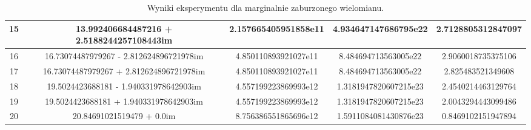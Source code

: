 \documentclass{article}
\begin{document}
\begin{table}[H]
\begin{adjustbox}{center}
\begin{tabular}{|c|c|c|c|c|}
    \hline
    15 & 13.992406684487216 + 2.5188244257108443im & 2.157665405951858e11 & 4.934647147686795e22 & 2.7128805312847097\\
    \hline
    16 & 16.73074487979267 - 2.812624896721978im & 4.850110893921027e11 & 8.484694713563005e22 & 2.9060018735375106\\
    \hline
    17 & 16.73074487979267 + 2.812624896721978im & 4.850110893921027e11 & 8.484694713563005e22 & 2.825483521349608\\
    \hline
    18 & 19.5024423688181 - 1.940331978642903im & 4.557199223869993e12 & 1.3181947820607215e23 & 2.4540214463129764\\
    \hline
    19 & 19.5024423688181 + 1.940331978642903im & 4.557199223869993e12 & 1.3181947820607215e23 & 2.0043294443099486\\
    \hline
    20 & 20.84691021519479 + 0.0im & 8.756386551865696e12 & 1.5911084081430876e23 & 0.8469102151947894\\
    \hline
\end{tabular}
\end{adjustbox}
\caption{Wyniki eksperymentu dla marginalnie zaburzonego wielomianu.}
\end{table}
\end{document}
